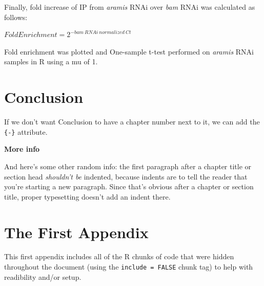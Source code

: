 \documentclass[12pt,twoside]{reedthesis}
\begin{document}
Finally, fold increase of IP from \emph{aramis} RNAi over \emph{bam} RNAi was
calculated as follows:

\(Fold Enrichment = 2^{-bam\ RNAi\ normalized\ Ct}\)

Fold enrichment was plotted and One-sample t-test performed on \emph{aramis}
RNAi samples in R using a mu of 1.

\hypertarget{conclusion}{%
\chapter*{Conclusion}\label{conclusion}}

If we don't want Conclusion to have a chapter number next to it, we can add the \texttt{\{-\}} attribute.

\textbf{More info}

And here's some other random info: the first paragraph after a chapter title or section head \emph{shouldn't be} indented, because indents are to tell the reader that you're starting a new paragraph. Since that's obvious after a chapter or section title, proper typesetting doesn't add an indent there.

\appendix

\hypertarget{the-first-appendix}{%
\chapter{The First Appendix}\label{the-first-appendix}}

This first appendix includes all of the R chunks of code that were hidden throughout the document (using the \texttt{include\ =\ FALSE} chunk tag) to help with readibility and/or setup.
\end{document}
